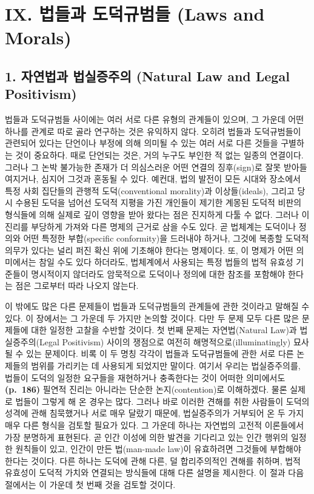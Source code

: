 \section{IX. 법들과 도덕규범들 (Laws and
Morals)}\label{ix.-uxbc95uxb4e4uxacfc-uxb3c4uxb355uxaddcuxbc94uxb4e4-laws-and-morals}

\subsection{1. 자연법과 법실증주의 (Natural Law and Legal
Positivism)}\label{uxc790uxc5f0uxbc95uxacfc-uxbc95uxc2e4uxc99duxc8fcuxc758-natural-law-and-legal-positivism}

법들과 도덕규범들 사이에는 여러 서로 다른 유형의 관계들이 있으며, 그
가운데 어떤 하나를  관계로 따로 골라 연구하는 것은
유익하지 않다. 오히려 법들과 도덕규범들이 관련되어 있다는 단언이나
부정에 의해 의미될 수 있는 여러 서로 다른 것들을 구별하는 것이 중요하다.
때로 단언되는 것은, 거의 누구도 부인한 적 없는 일종의 연결이다. 그러나
그 논박 불가능한 존재가 더 의심스러운 어떤 연결의 징후(sign)로 잘못
받아들여지거나, 심지어 그것과 혼동될 수 있다. 예컨대, 법의 발전이 모든
시대와 장소에서 특정 사회 집단들의 관행적 도덕(conventional morality)과
이상들(ideals), 그리고 당시 수용된 도덕을 넘어선 도덕적 지평을 가진
개인들이 제기한 계몽된 도덕적 비판의 형식들에 의해 실제로 깊이 영향을
받아 왔다는 점은 진지하게 다툴 수 없다. 그러나 이 진리를 부당하게 가져와
다른 명제의 근거로 삼을 수도 있다. 곧 법체계는 도덕이나 정의와 어떤
특정한 부합(specific conformity)을  드러내야 하거나, 그것에
복종할 도덕적 의무가 있다는 널리 퍼진 확신 위에  기초해야
한다는 명제이다. 또, 이 명제가 어떤 의미에서는 참일 수도 있다 하더라도,
법체계에서 사용되는 특정 법들의 법적 유효성 기준들이 명시적이지 않더라도
암묵적으로 도덕이나 정의에 대한 참조를 포함해야 한다는 점은 그로부터
따라 나오지 않는다.

이 밖에도 많은 다른 문제들이 법들과 도덕규범들의 관계들에 관한 것이라고
말해질 수 있다. 이 장에서는 그 가운데 두 가지만 논의할 것이다. 다만 두
문제 모두 다른 많은 문제들에 대한 일정한 고찰을 수반할 것이다. 첫 번째
문제는 자연법(Natural Law)과 법실증주의(Legal Positivism) 사이의
쟁점으로 여전히 해명적으로(illuminatingly) 묘사될 수 있는 문제이다. 비록
이 두 명칭 각각이 법들과 도덕규범들에 관한 서로 다른 논제들의 범위를
가리키는 데 사용되게 되었지만 말이다. 여기서 우리는 법실증주의를, 법들이
도덕의 일정한 요구들을 재현하거나 충족한다는 것이 어떠한 의미에서도
\textbf{(p.~186)} 필연적 진리는 아니라는 단순한 논지(contention)로
이해하겠다. 물론 실제로 법들이 그렇게 해 온 경우는 많다. 그러나 바로
이러한 견해를 취한 사람들이 도덕의 성격에 관해 침묵했거나 서로 매우
달랐기 때문에, 법실증주의가 거부되어 온 두 가지 매우 다른 형식을 검토할
필요가 있다. 그 가운데 하나는 자연법의 고전적 이론들에서 가장 분명하게
표현된다. 곧 인간 이성에 의한 발견을 기다리고 있는 인간 행위의 일정한
원칙들이 있고, 인간이 만든 법(man-made law)이 유효하려면 그것들에
부합해야 한다는 것이다. 다른 하나는 도덕에 관해 다른, 덜 합리주의적인
견해를 취하며, 법적 유효성이 도덕적 가치와 연결되는 방식들에 대해 다른
설명을 제시한다. 이 절과 다음 절에서는 이 가운데 첫 번째 것을 검토할
것이다.

